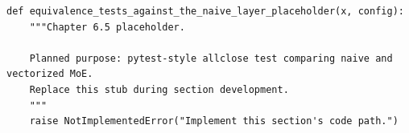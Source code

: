\begin{lstlisting}[style=bookpython,caption={Planned code placeholder for equivalence tests against the naive layer.},label={lst:ch06-equivalence-tests-against-the-naive-layer}]
def equivalence_tests_against_the_naive_layer_placeholder(x, config):
    """Chapter 6.5 placeholder.

    Planned purpose: pytest-style allclose test comparing naive and vectorized MoE.
    Replace this stub during section development.
    """
    raise NotImplementedError("Implement this section's code path.")
\end{lstlisting}
